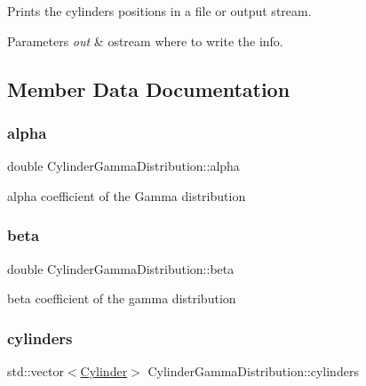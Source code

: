 Prints the cylinders positions in a file or output stream. 


\begin{DoxyParams}{Parameters}
{\em out} & ostream where to write the info. \\
\hline
\end{DoxyParams}


\subsection{Member Data Documentation}
\mbox{\label{class_cylinder_gamma_distribution_a8cae528f51692ed05049e4ea06c63722}} 
\subsubsection{\texorpdfstring{alpha}{alpha}}
{\footnotesize\ttfamily double Cylinder\+Gamma\+Distribution\+::alpha}

alpha coefficient of the Gamma distribution \mbox{\label{class_cylinder_gamma_distribution_a601a42ef7bacbf9696229efbd703f61e}} 
\subsubsection{\texorpdfstring{beta}{beta}}
{\footnotesize\ttfamily double Cylinder\+Gamma\+Distribution\+::beta}

beta coefficient of the gamma distribution \mbox{\label{class_cylinder_gamma_distribution_a3e8265a7ddb15d895112e02bd66fbf67}} 
\subsubsection{\texorpdfstring{cylinders}{cylinders}}
{\footnotesize\ttfamily std\+::vector$<$\hyperlink{class_cylinder}{Cylinder}$>$ Cylinder\+Gamma\+Distribution\+::cylinders}

